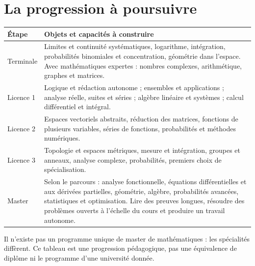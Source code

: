 \documentclass[../cours_1re.tex]{subfiles}
\begin{document}
\section{La progression à poursuivre}
\begin{longtable}{>{\raggedright\arraybackslash}p{.18\linewidth}>{\raggedright\arraybackslash}p{.74\linewidth}}
\toprule Étape & Objets et capacités à construire\\\midrule
Terminale &
Limites et continuité systématiques, logarithme, intégration, probabilités
binomiales et concentration, géométrie dans l'espace. Avec mathématiques
expertes : nombres complexes, arithmétique, graphes et matrices.\\
Licence 1 &
Logique et rédaction autonome ; ensembles et applications ; analyse réelle,
suites et séries ; algèbre linéaire et systèmes ; calcul différentiel et intégral.\\
Licence 2 &
Espaces vectoriels abstraits, réduction des matrices, fonctions de plusieurs
variables, séries de fonctions, probabilités et méthodes numériques.\\
Licence 3 &
Topologie et espaces métriques, mesure et intégration, groupes et anneaux,
analyse complexe, probabilités, premiers choix de spécialisation.\\
Master &
Selon le parcours : analyse fonctionnelle, équations différentielles et aux
dérivées partielles, géométrie, algèbre, probabilités avancées, statistiques
et optimisation. Lire des preuves longues, résoudre des problèmes ouverts
à l'échelle du cours et produire un travail autonome.\\\bottomrule
\end{longtable}
Il n'existe pas un programme unique de master de mathématiques :
les spécialités diffèrent. Ce tableau est une progression pédagogique,
pas une équivalence de diplôme ni le programme d'une université donnée.
\end{document}
